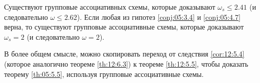 \begin{corollary}
  Существуют групповые ассоциативных схемы, которые доказывают $\omega_s \leq 2.41$ (и следовательно $\omega \leq 2.62$). Если любая из гипотез \ref{conj:05:3.4} и \ref{conj:05:4.7} верна, то существуют групповые ассоциативные схемы, которые доказывают $\omega_s = 2$ (и следовательно $\omega = 2$).
\end{corollary}

В более общем смысле, можно скопировать переход от следствия \ref{cor:12:5.4} (которое аналогично теореме \ref{th:12:6.3}) к теореме \ref{th:12:5.5}, чтобы доказать теорему \ref{th:05:5.5}, используя групповые ассоциативные схемы.























